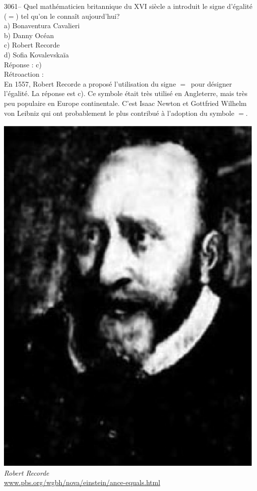 \documentclass[letterpaper, 12pt]{article}
\begin{document}
3061-- Quel math\'ematicien britannique du {\scriptsize XVI\ieme{}} si\`ecle a introduit le signe d'\'egalit\'e ($=$) tel qu'on le conna\^it aujourd'hui?\\

a) Bonaventura Cavalieri\\
b) Danny Oc\'ean\\
c) Robert Recorde\\
d) Sofia Kovalevska\"ia\\

R\'eponse : c)\\

R\'etroaction :\\
En 1557, Robert Recorde a propos\'e l'utilisation du signe \og$=$\fg \ pour d\'esigner l'\'egalit\'e. La r\'eponse est c). Ce symbole \'etait tr\`es utilis\'e en Angleterre, mais tr\`es peu populaire en Europe continentale. C'est Isaac Newton et Gottfried Wilhelm von Leibniz qui ont probablement le plus contribu\'e \`a l'adoption du symbole \og$=$\fg.\\
\begin{center}
\includegraphics[scale=0.4]{recorde.eps}\\
\emph{{\small Robert Recorde}}\\
\href{http://www.pbs.org/wgbh/nova/einstein/ance-equals.html}{www.pbs.org/wgbh/nova/einstein/ance-equals.html}\\[5mm]
\end{center}
\end{document}
